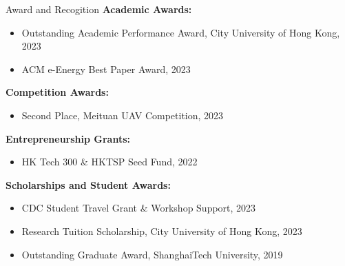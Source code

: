 \documentclass{resume} %
\begin{document}
\begin{rSection}{Award and Recogition}
        \textbf{Academic Awards:}
        \begin{itemize}
            \item Outstanding Academic Performance Award, City University of Hong Kong, 2023
            \item ACM e-Energy Best Paper Award, 2023
        \end{itemize}
        
        \textbf{Competition Awards:} 
        \begin{itemize}
            \item Second Place, Meituan UAV Competition, 2023
        \end{itemize}
        
        \textbf{Entrepreneurship Grants:} 
        \begin{itemize}
            \item HK Tech 300 \& HKTSP Seed Fund, 2022
        \end{itemize}
        
        \textbf{Scholarships and Student Awards:}
        \begin{itemize}
            \item CDC Student Travel Grant \& Workshop Support, 2023
            \item Research Tuition Scholarship, City University of Hong Kong, 2023
            \item Outstanding Graduate Award, ShanghaiTech University, 2019
        \end{itemize}
    
\end{rSection}
\end{document}
